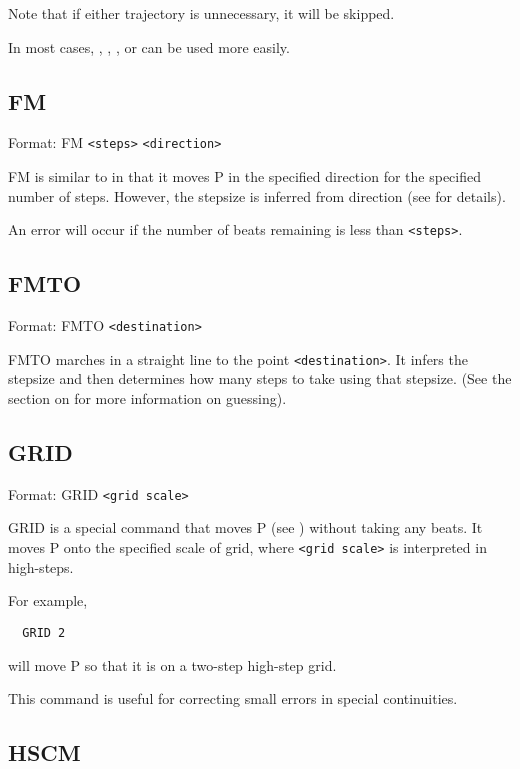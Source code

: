Note that if either trajectory is unnecessary, it will be skipped.

In most cases, , ,
, or  can be used more easily.

\subsection{FM}\label{fm}

Format: FM \verb$<steps>$ \verb$<direction>$

FM is similar to  in that it moves P in the
specified direction for the specified number of steps.  However, the
stepsize is inferred from direction (see 
for details).

An error will occur if the number of beats remaining is less than
\verb$<steps>$.

\subsection{FMTO}\label{fmto}

Format: FMTO \verb$<destination>$

FMTO marches in a straight line to the point \verb$<destination>$.  It
infers the stepsize and then determines how many steps to take using
that stepsize.  (See the section on  for
more information on guessing).

\subsection{GRID}\label{grid}

Format: GRID \verb$<grid scale>$

GRID is a special command that moves P (see )
without taking any beats.  It moves P onto the specified scale of grid,
where \verb$<grid scale>$ is interpreted in high-steps.

For example,
\begin{verbatim}
  GRID 2
\end{verbatim}
will move P so that it is on a two-step high-step grid.

This command is useful for correcting small errors in special continuities.

\subsection{HSCM}\label{hscm}

